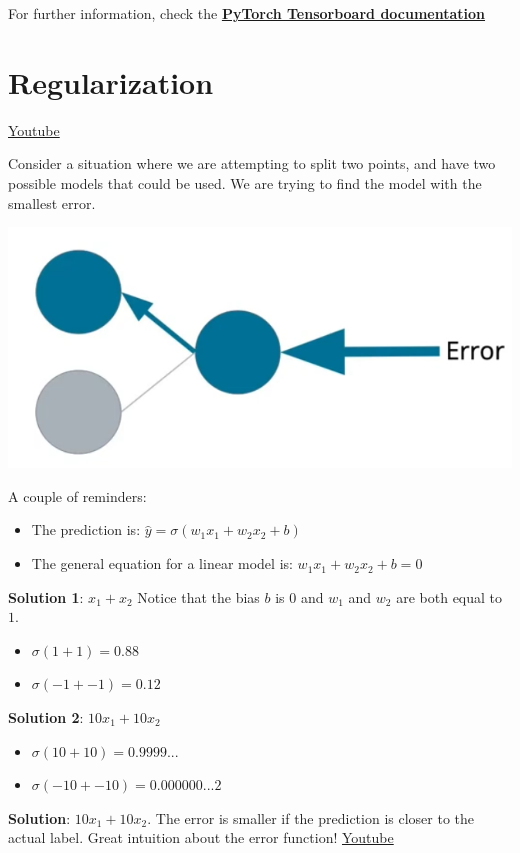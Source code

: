 For further information, check the \href{https://pytorch.org/docs/stable/tensorboard.html}{\textbf{PyTorch Tensorboard documentation}}

\section{Regularization}
\href{https://www.youtube.com/watch?v=KxROxcRsHL8&ab_channel=Udacity}{Youtube} \newline

Consider a situation where we are attempting to split two points, and have two possible models that could be used. We are trying to find the model with the smallest error.

\includegraphics[width=0.75\linewidth]{img//intro//trainingNN/image2.png}

A couple of reminders:
\begin{itemize}
    \item The prediction is: \(\hat{y} = \sigma(w_1 x_1 + w_2 x_2 + b)\)
    \item The general equation for a linear model is: \(w_1 x_1 + w_2 x_2 + b = 0\)
\end{itemize}

\textbf{Solution 1}: \(x_1 + x_2\)\newline
Notice that the bias \(b\) is \(0\) and \(w_1\) and \(w_2\) are both equal to \(1\).
\begin{itemize}
    \item \(\sigma(1 + 1) = 0.88\)
    \item \(\sigma(-1 + -1) = 0.12\)
\end{itemize}

\textbf{Solution 2}: \(10x_1 + 10x_2\)
\begin{itemize}
    \item \(\sigma(10 + 10) = 0.9999...\)
    \item \(\sigma(-10 + -10) = 0.000000...2\)
\end{itemize}

\textbf{Solution}: \(10x_1 + 10x_2\). The error is smaller if the prediction is closer to the actual label. Great intuition about the error function! \href{https://www.youtube.com/watch?v=ndYnUrx8xvs&t=66s&ab_channel=Udacity}{Youtube}\newline

